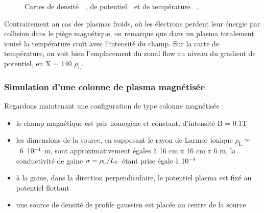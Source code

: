 \begin{refsection}
\begin{figure}[!htbp]
    \caption{Cartes de densité~~, de
    potentiel~~et de température
   ~.}
    \label{2-CartesWithTe}
	\end{figure}
	
Contrairement au cas des plasmas froids, où les électrons perdent leur énergie
par collision dans le piège magnétique, on
remarque que dans un plasma totalement ionisé la température croît avec
l'intensité du champ. Sur la carte de température, on voit bien l'emplacement du
zonal flow au niveau du gradient de potentiel, en X $\sim$ 140 $\rho_\text{L}$.
	
\subsubsection{Simulation d'une colonne de plasma magnétisée}
Regardons maintenant une configuration de type colonne magnétisée : 

\begin{itemize}
  \item le champ magnétique est pris homogène et constant, d'intensité B = 0.1T
  \item les dimensions de la source, en supposant le rayon de Larmor ionique
  $\rho_\text{L}\simeq$~6~10$^{-4}$~m, sont approximativement égales à 16 cm x
  16 cm x 6 m, la conductivité de gaine $\sigma=\rho_\text{L}/L_\para$ étant prise
  égale à 10$^{-4}$
  \item à la gaine, dans la direction perpendiculaire, le potentiel plasma est
  fixé au potentiel flottant
  \item une source de densité de profile gaussien est placée au centre de la
  source
\end{itemize}


\end{refsection}
